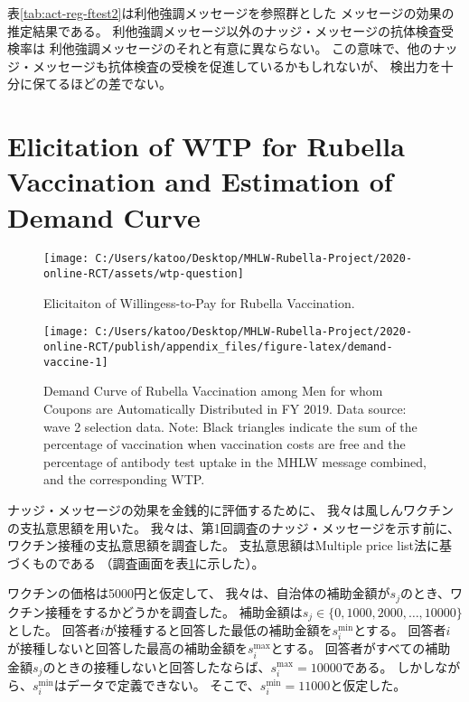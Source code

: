 \documentclass[
  11pt,
  a4paper,
]{article}
\begin{document}
表\ref{tab:act-reg-ftest2}は利他強調メッセージを参照群とした
メッセージの効果の推定結果である。
利他強調メッセージ以外のナッジ・メッセージの抗体検査受検率は
利他強調メッセージのそれと有意に異ならない。
この意味で、他のナッジ・メッセージも抗体検査の受検を促進しているかもしれないが、
検出力を十分に保てるほどの差でない。

\clearpage

\hypertarget{elicitation-of-wtp-for-rubella-vaccination-and-estimation-of-demand-curve}{%
\section{Elicitation of WTP for Rubella Vaccination and Estimation of Demand Curve}\label{elicitation-of-wtp-for-rubella-vaccination-and-estimation-of-demand-curve}}

\begin{figure}[t]
\texttt{[image: C:/Users/katoo/Desktop/MHLW-Rubella-Project/2020-online-RCT/assets/wtp-question]} \caption{Elicitaiton of Willingess-to-Pay for Rubella Vaccination.}\label{fig:wtp-question}
\end{figure}
\begin{figure}[t]
\texttt{[image: C:/Users/katoo/Desktop/MHLW-Rubella-Project/2020-online-RCT/publish/appendix\_files/figure-latex/demand-vaccine-1]} \caption{Demand Curve of Rubella Vaccination among Men for whom Coupons are Automatically Distributed in FY 2019. Data source: wave 2 selection data. Note: Black triangles indicate the sum of the percentage of vaccination when vaccination costs are free and the percentage of antibody test uptake in the MHLW message combined, and the corresponding WTP.}\label{fig:demand-vaccine}
\end{figure}

ナッジ・メッセージの効果を金銭的に評価するために、
我々は風しんワクチンの支払意思額を用いた。
我々は、第1回調査のナッジ・メッセージを示す前に、ワクチン接種の支払意思額を調査した。
支払意思額はMultiple price list法に基づくものである
（調査画面を表\ref{fig:wtp-question}に示した）。

ワクチンの価格は5000円と仮定して、
我々は、自治体の補助金額が\(s_j\)のとき、ワクチン接種をするかどうかを調査した。
補助金額は\(s_j \in \{0, 1000, 2000, \ldots, 10000\}\)とした。
回答者\(i\)が接種すると回答した最低の補助金額を\(s_i^{\text{min}}\)とする。
回答者\(i\)が接種しないと回答した最高の補助金額を\(s_i^{\text{max}}\)とする。
回答者がすべての補助金額\(s_j\)のときの接種しないと回答したならば、\(s_i^{\text{max}} = 10000\)である。
しかしながら、\(s_i^{\text{min}}\)はデータで定義できない。
そこで、\(s_i^{\text{min}} = 11000\)と仮定した。
\end{document}
